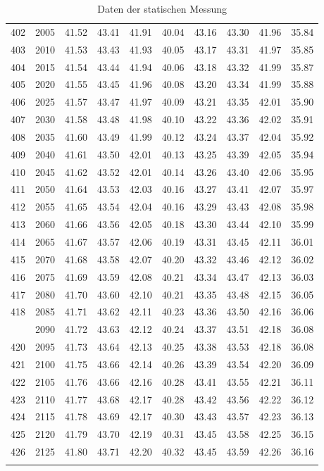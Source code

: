 \begin{longtable}{rrllllllll}
402 & 2005 & 41.52 & 43.41 & 41.91 & 40.04 & 43.16 & 43.30 & 41.96 & 35.84 \\ 
403 & 2010 & 41.53 & 43.43 & 41.93 & 40.05 & 43.17 & 43.31 & 41.97 & 35.85 \\ 
404 & 2015 & 41.54 & 43.44 & 41.94 & 40.06 & 43.18 & 43.32 & 41.99 & 35.87 \\ 
405 & 2020 & 41.55 & 43.45 & 41.96 & 40.08 & 43.20 & 43.34 & 41.99 & 35.88 \\ 
406 & 2025 & 41.57 & 43.47 & 41.97 & 40.09 & 43.21 & 43.35 & 42.01 & 35.90 \\ 
407 & 2030 & 41.58 & 43.48 & 41.98 & 40.10 & 43.22 & 43.36 & 42.02 & 35.91 \\ 
408 & 2035 & 41.60 & 43.49 & 41.99 & 40.12 & 43.24 & 43.37 & 42.04 & 35.92 \\ 
409 & 2040 & 41.61 & 43.50 & 42.01 & 40.13 & 43.25 & 43.39 & 42.05 & 35.94 \\ 
410 & 2045 & 41.62 & 43.52 & 42.01 & 40.14 & 43.26 & 43.40 & 42.06 & 35.95 \\ 
411 & 2050 & 41.64 & 43.53 & 42.03 & 40.16 & 43.27 & 43.41 & 42.07 & 35.97 \\ 
412 & 2055 & 41.65 & 43.54 & 42.04 & 40.16 & 43.29 & 43.43 & 42.08 & 35.98 \\ 
413 & 2060 & 41.66 & 43.56 & 42.05 & 40.18 & 43.30 & 43.44 & 42.10 & 35.99 \\ 
414 & 2065 & 41.67 & 43.57 & 42.06 & 40.19 & 43.31 & 43.45 & 42.11 & 36.01 \\ 
415 & 2070 & 41.68 & 43.58 & 42.07 & 40.20 & 43.32 & 43.46 & 42.12 & 36.02 \\ 
416 & 2075 & 41.69 & 43.59 & 42.08 & 40.21 & 43.34 & 43.47 & 42.13 & 36.03 \\ 
417 & 2080 & 41.70 & 43.60 & 42.10 & 40.21 & 43.35 & 43.48 & 42.15 & 36.05 \\ 
418 & 2085 & 41.71 & 43.62 & 42.11 & 40.23 & 43.36 & 43.50 & 42.16 & 36.06 \\ 
\pagebreak
419 & 2090 & 41.72 & 43.63 & 42.12 & 40.24 & 43.37 & 43.51 & 42.18 & 36.08 \\ 
420 & 2095 & 41.73 & 43.64 & 42.13 & 40.25 & 43.38 & 43.53 & 42.18 & 36.08 \\ 
421 & 2100 & 41.75 & 43.66 & 42.14 & 40.26 & 43.39 & 43.54 & 42.20 & 36.09 \\ 
422 & 2105 & 41.76 & 43.66 & 42.16 & 40.28 & 43.41 & 43.55 & 42.21 & 36.11 \\ 
423 & 2110 & 41.77 & 43.68 & 42.17 & 40.28 & 43.42 & 43.56 & 42.22 & 36.12 \\ 
424 & 2115 & 41.78 & 43.69 & 42.17 & 40.30 & 43.43 & 43.57 & 42.23 & 36.13 \\ 
425 & 2120 & 41.79 & 43.70 & 42.19 & 40.31 & 43.45 & 43.58 & 42.25 & 36.15 \\ 
426 & 2125 & 41.80 & 43.71 & 42.20 & 40.32 & 43.45 & 43.59 & 42.26 & 36.16 \\ 
\caption{Daten der statischen Messung}
\label{Messung1}
\end{longtable}
